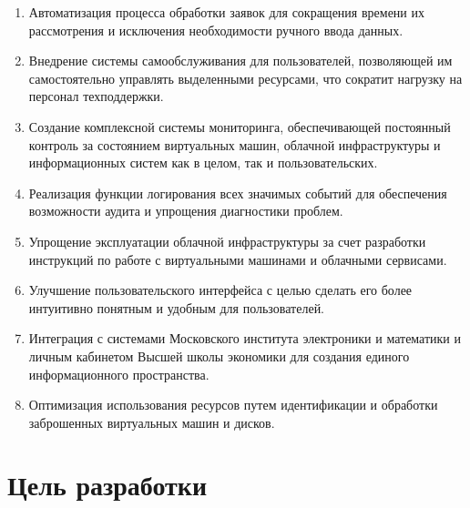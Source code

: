 \documentclass[14pt, a4paper]{extarticle}
\begin{document}
\begin{enumerate}
\item Автоматизация процесса обработки заявок для сокращения времени их рассмотрения и исключения необходимости ручного ввода данных.
\item Внедрение системы самообслуживания для пользователей, позволяющей им самостоятельно управлять выделенными ресурсами, что сократит нагрузку на персонал техподдержки.
\item Создание комплексной системы мониторинга, обеспечивающей постоянный контроль за состоянием виртуальных машин, облачной инфраструктуры и информационных систем как в целом, так и пользовательских.
\item Реализация функции логирования всех значимых событий для обеспечения возможности аудита и упрощения диагностики проблем.
\item Упрощение эксплуатации облачной инфраструктуры за счет разработки инструкций по работе с виртуальными машинами и облачными сервисами.
\item Улучшение пользовательского интерфейса с целью сделать его более интуитивно понятным и удобным для пользователей.
\item Интеграция с системами Московского института электроники и математики и личным кабинетом Высшей школы экономики для создания единого информационного пространства.
\item Оптимизация использования ресурсов путем идентификации и обработки заброшенных виртуальных машин и дисков.
\end{enumerate}

\section{Цель разработки}
\end{document}
